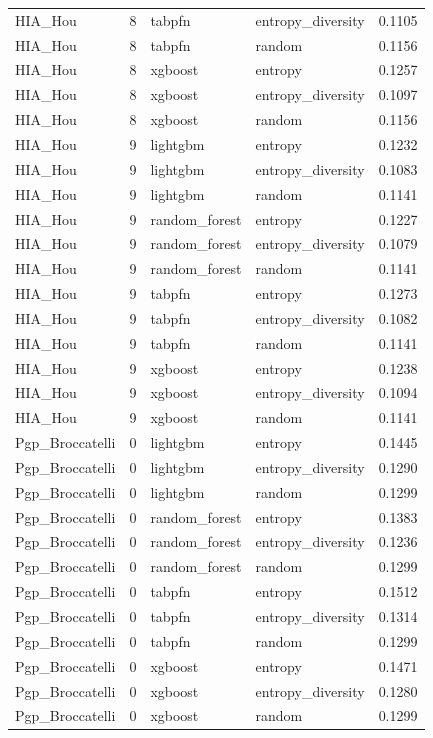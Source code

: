 \begin{tabular}{lrllr}
HIA_Hou & 8 & tabpfn & entropy_diversity & 0.1105 \\
HIA_Hou & 8 & tabpfn & random & 0.1156 \\
HIA_Hou & 8 & xgboost & entropy & 0.1257 \\
HIA_Hou & 8 & xgboost & entropy_diversity & 0.1097 \\
HIA_Hou & 8 & xgboost & random & 0.1156 \\
HIA_Hou & 9 & lightgbm & entropy & 0.1232 \\
HIA_Hou & 9 & lightgbm & entropy_diversity & 0.1083 \\
HIA_Hou & 9 & lightgbm & random & 0.1141 \\
HIA_Hou & 9 & random_forest & entropy & 0.1227 \\
HIA_Hou & 9 & random_forest & entropy_diversity & 0.1079 \\
HIA_Hou & 9 & random_forest & random & 0.1141 \\
HIA_Hou & 9 & tabpfn & entropy & 0.1273 \\
HIA_Hou & 9 & tabpfn & entropy_diversity & 0.1082 \\
HIA_Hou & 9 & tabpfn & random & 0.1141 \\
HIA_Hou & 9 & xgboost & entropy & 0.1238 \\
HIA_Hou & 9 & xgboost & entropy_diversity & 0.1094 \\
HIA_Hou & 9 & xgboost & random & 0.1141 \\
Pgp_Broccatelli & 0 & lightgbm & entropy & 0.1445 \\
Pgp_Broccatelli & 0 & lightgbm & entropy_diversity & 0.1290 \\
Pgp_Broccatelli & 0 & lightgbm & random & 0.1299 \\
Pgp_Broccatelli & 0 & random_forest & entropy & 0.1383 \\
Pgp_Broccatelli & 0 & random_forest & entropy_diversity & 0.1236 \\
Pgp_Broccatelli & 0 & random_forest & random & 0.1299 \\
Pgp_Broccatelli & 0 & tabpfn & entropy & 0.1512 \\
Pgp_Broccatelli & 0 & tabpfn & entropy_diversity & 0.1314 \\
Pgp_Broccatelli & 0 & tabpfn & random & 0.1299 \\
Pgp_Broccatelli & 0 & xgboost & entropy & 0.1471 \\
Pgp_Broccatelli & 0 & xgboost & entropy_diversity & 0.1280 \\
Pgp_Broccatelli & 0 & xgboost & random & 0.1299 \\

\end{tabular}
